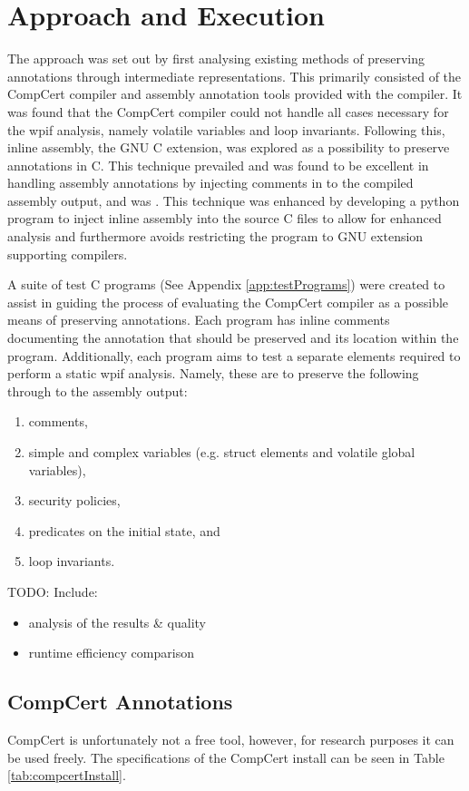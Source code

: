 
\section{Approach and Execution}
The approach was set out by first analysing existing methods of preserving annotations through intermediate representations. This primarily consisted of the CompCert compiler and assembly annotation tools provided with the compiler. It was found that the CompCert compiler could not handle all cases necessary for the wpif analysis, namely volatile variables and loop invariants. Following this, inline assembly, the GNU C extension, was explored as a possibility to preserve annotations in C. This technique prevailed and was found to be excellent in handling assembly annotations by injecting comments in to the compiled assembly output, and was . This technique was enhanced by developing a python program to inject inline assembly into the source C files to allow for enhanced analysis and furthermore avoids restricting the program to GNU extension supporting compilers.

A suite of test C programs (See Appendix \ref{app:testPrograms}) were created to assist in guiding the process of evaluating the CompCert compiler as a possible means of preserving annotations. Each program has inline comments documenting the annotation that should be preserved and its location within the program. Additionally, each program aims to test a separate elements required to perform a static wpif analysis. Namely, these are to preserve the following through to the assembly output:

\begin{enumerate}
    \item comments,
    \item simple and complex variables (e.g. struct elements and volatile global variables),
    \item security policies,
    \item predicates on the initial state, and
    \item loop invariants.
\end{enumerate}

TODO: Include:
\begin{itemize}
    \item analysis of the results \& quality
    \item runtime efficiency comparison
\end{itemize}

\subsection{CompCert Annotations}
CompCert is unfortunately not a free tool, however, for research purposes it can be used freely. The specifications of the CompCert install can be seen in Table \ref{tab:compcertInstall}. 

